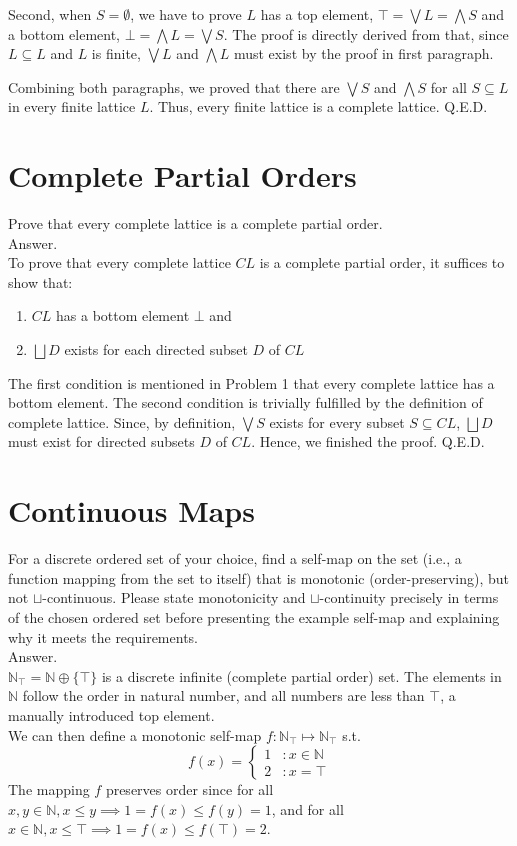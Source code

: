 \documentclass[a4paper,11pt]{article}
\theoremstyle{mytheor}
\begin{document}
Second, when $S = \emptyset$, we have to prove $L$ has a top element, 
$\top = \bigvee L = \bigwedge S$ and a bottom element, 
$\bot = \bigwedge L = \bigvee S$. The proof is directly derived from 
that, since $L \subseteq L$ and $L$ is finite, $\bigvee L$ and $\bigwedge 
L$ must exist by the proof in first paragraph. 

Combining both paragraphs, we proved that there are $\bigvee S$ and
$\bigwedge S$ for all $S \subseteq L$ in every finite lattice $L$.
Thus, every finite lattice is a complete lattice. Q.E.D.

\section{Complete Partial Orders}
Prove that every complete lattice is a complete partial order.
\medskip \\
Answer.
\smallskip \\
To prove that every complete lattice $CL$ is a complete partial order, it 
suffices to show that:
\begin{enumerate}
\item $CL$ has a bottom element $\bot$ and
\item $\bigsqcup D$ exists for each directed subset $D$ of $CL$
\end{enumerate}
The first condition is mentioned in Problem 1 that every complete lattice
has a bottom element. The second condition is trivially fulfilled by the
definition of complete lattice. Since, by definition, $\bigvee S$ exists 
for every subset $S \subseteq CL$, $\bigsqcup D$ must exist for directed 
subsets $D$ of $CL$. Hence, we finished the proof. Q.E.D.

\section{Continuous Maps}
For a discrete ordered set of your choice, find a self-map on the set
(i.e., a function mapping from the set to itself) that is monotonic
(order-preserving), but not $\sqcup$-continuous. Please state monotonicity
and $\sqcup$-continuity precisely in terms of the chosen ordered set
before presenting the example self-map and explaining why it meets the
requirements.
\medskip \\
Answer.
\smallskip \\
$\mathbb{N}_{\top} = \mathbb{N} \oplus \{\top\}$ is a discrete infinite
(complete partial order) set. The elements in $\mathbb{N}$ follow the
order in natural number, and all numbers are less than $\top$, a manually
introduced top element. \\
We can then define a monotonic self-map $f: \mathbb{N}_{\top} \mapsto \mathbb{N}_{\top}$ s.t.
\begin{equation*}
f(x) = \left\{
  \begin{array}{lr}
    1  & : x \in \mathbb{N} \\
    2  & : x = \top
  \end{array}
\right.
\end{equation*}
The mapping $f$ preserves order since for all $x, y \in \mathbb{N}, 
x \leq y \implies 1 = f(x) \leq f(y) = 1$, and for all $x \in \mathbb{N},
x \leq \top \implies 1 = f(x) \leq f(\top) = 2$.
\end{document}
